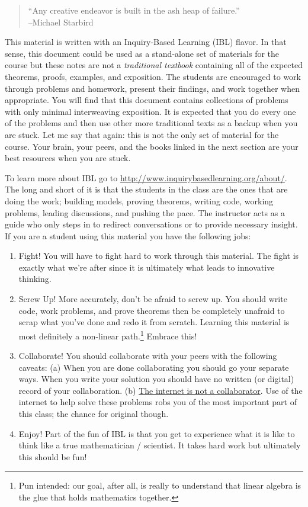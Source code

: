 \begin{quote}
    ``Any creative endeavor is built in the ash heap of failure.'' \\ --Michael Starbird
\end{quote}


This material is written with an Inquiry-Based Learning (IBL) flavor. In that sense, this
document could be used as a stand-alone set of materials for the course but these notes
are not a {\it traditional textbook} containing all of the expected theorems, proofs,
examples, and exposition. The students are encouraged to work through problems and
homework, present their findings, and work together when appropriate. You will find that
this document contains collections of problems with only minimal interweaving exposition.
It is expected that you do every one of the problems and then use other more traditional
texts as a backup when you are stuck.  Let me say that again: this is not the only set of
material for the course.  Your brain, your peers, and the books linked in the next section
are your best resources when you are stuck.

To learn more about IBL go to
\href{http://www.inquirybasedlearning.org/about/}{http://www.inquirybasedlearning.org/about/}.
The long and short of it is that the students in the class are the ones that are doing the
work; building models, proving theorems, writing code, working problems, leading discussions, and pushing the pace. The
instructor acts as a guide who only steps in to redirect conversations or to provide
necessary insight. If you are a student using this material you have the following jobs:
\begin{enumerate}
\item Fight!  You will have to fight hard to work through this material.  The fight is
        exactly what we're after since it is ultimately what leads to innovative thinking.
\item Screw Up!  More accurately, don't be afraid to screw up.  You should write code,
    work problems, and prove theorems then be completely unafraid to scrap what you've
    done and redo it from scratch.  Learning this material is most definitely a non-linear
    path.\footnote{Pun intended: our goal, after all, is really to understand that linear
        algebra is the glue that holds mathematics together.}
        Embrace this!
\item Collaborate!  You should collaborate with your peers with the following caveats:
        (a) When you are done collaborating you should go your separate ways.  When you
        write your solution you should have no written (or digital) record of your
        collaboration.  (b) \underline{The internet is not a collaborator}.  Use of the internet to
        help solve these problems robs you of the most important part of this class; the
        chance for original though.
\item Enjoy!  Part of the fun of IBL is that you get to experience what it is like to
        think like a true mathematician / scientist.  It takes hard work but ultimately
        this should be fun!
\end{enumerate}

